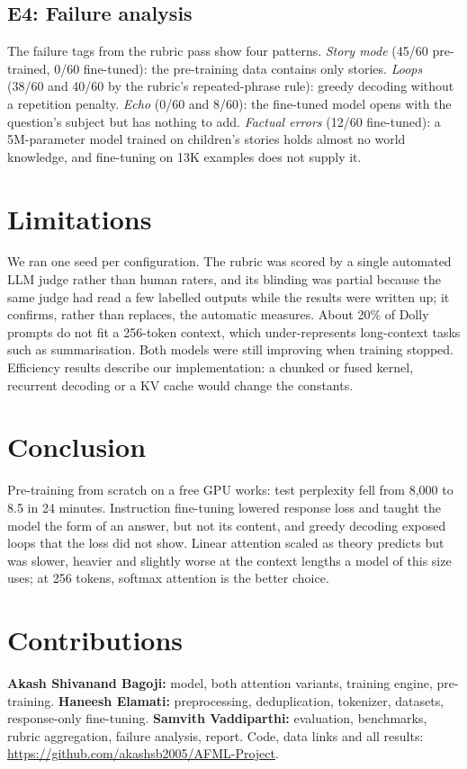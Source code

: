 \documentclass[conference]{IEEEtran}
\begin{document}
\subsection{E4: Failure analysis}
The failure tags from the rubric pass show four patterns. \emph{Story mode} (45/60 pre-trained, 0/60 fine-tuned):
the pre-training data contains only stories. \emph{Loops} (38/60 and 40/60 by the rubric's repeated-phrase rule):
greedy decoding without a repetition penalty. \emph{Echo} (0/60 and 8/60): the fine-tuned model opens with the
question's subject but has nothing to add. \emph{Factual errors} (12/60 fine-tuned): a 5M-parameter model trained on
children's stories holds almost no world knowledge, and fine-tuning on 13K examples does not supply it.

\section{Limitations}\label{sec:limits}
We ran one seed per configuration. The rubric was scored by a single automated LLM judge rather than human raters,
and its blinding was partial because the same judge had read a few labelled outputs while the results were written
up; it confirms, rather than replaces, the automatic measures. About 20\% of Dolly prompts do not fit a 256-token
context, which under-represents long-context tasks such as summarisation. Both models were still improving when
training stopped. Efficiency results describe our implementation: a chunked or fused kernel, recurrent decoding or a
KV cache would change the constants.

\section{Conclusion}
Pre-training from scratch on a free GPU works: test perplexity fell from 8{,}000 to 8.5 in 24 minutes. Instruction
fine-tuning lowered response loss and taught the model the form of an answer, but not its content, and greedy
decoding exposed loops that the loss did not show. Linear attention scaled as theory predicts but was slower, heavier
and slightly worse at the context lengths a model of this size uses; at 256 tokens, softmax attention is the better
choice.

\section*{Contributions}
\textbf{Akash Shivanand Bagoji:} model, both attention variants, training engine, pre-training.
\textbf{Haneesh Elamati:} preprocessing, deduplication, tokenizer, datasets, response-only fine-tuning.
\textbf{Samvith Vaddiparthi:} evaluation, benchmarks, rubric aggregation, failure analysis, report.
Code, data links and all results: \url{https://github.com/akashsb2005/AFML-Project}.
\end{document}

